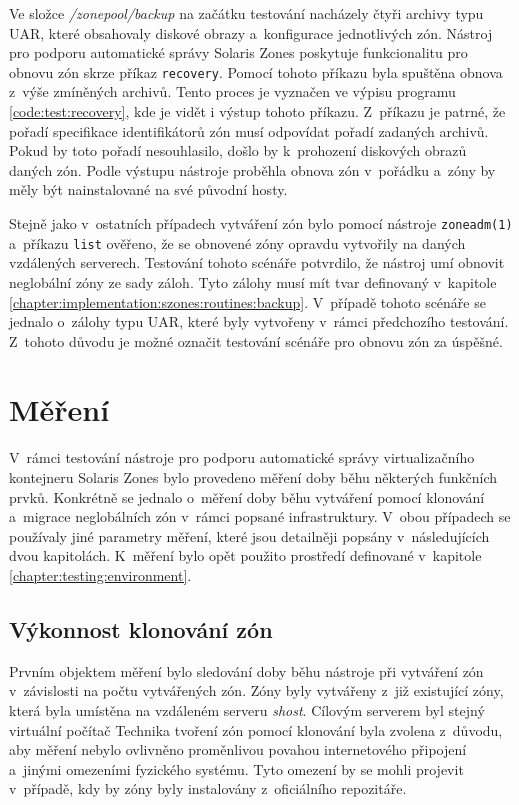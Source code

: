 Ve složce \textit{/zonepool/backup} na začátku testování nacházely čtyři archivy typu UAR, které obsahovaly diskové obrazy
a~konfigurace jednotlivých zón. Nástroj pro podporu automatické správy Solaris Zones poskytuje funkcionalitu pro obnovu zón skrze
příkaz \verb|recovery|. Pomocí tohoto příkazu byla spuštěna obnova z~výše zmíněných archivů. Tento proces je vyznačen ve výpisu
programu \ref{code:test:recovery}, kde je vidět i výstup tohoto příkazu. Z~příkazu je patrné, že pořadí specifikace identifikátorů
zón musí odpovídat pořadí zadaných archivů. Pokud by toto pořadí nesouhlasilo, došlo by k~prohození diskových obrazů daných
zón. Podle výstupu nástroje proběhla obnova zón v~pořádku a~zóny by měly být nainstalované na své původní hosty.

Stejně jako v~ostatních případech vytváření zón bylo pomocí nástroje \verb|zoneadm(1)| a~příkazu \verb|list| ověřeno, že se
obnovené zóny opravdu vytvořily na daných vzdálených serverech. Testování tohoto scénáře potvrdilo, že nástroj umí obnovit
neglobální zóny ze sady záloh. Tyto zálohy musí mít tvar definovaný v~kapitole \ref{chapter:implementation:szones:routines:backup}.
V~případě tohoto scénáře se jednalo o~zálohy typu UAR, které byly vytvořeny v~rámci předchozího testování. Z~tohoto důvodu je možné
označit testování scénáře pro obnovu zón za úspěšné.
\section{Měření}
\label{chapter:measurement}
V~rámci testování nástroje pro podporu automatické správy virtualizačního kontejneru Solaris Zones bylo provedeno měření doby
běhu některých funkčních prvků. Konkrétně se jednalo o~měření doby běhu vytváření pomocí klonování a~migrace neglobálních zón
v~rámci popsané infrastruktury. V~obou případech se používaly jiné parametry měření, které jsou detailněji popsány
v~následujících dvou kapitolách. K~měření bylo opět použito prostředí definované v~kapitole \ref{chapter:testing:environment}.
\subsection{Výkonnost klonování zón}
\label{chapter:measurement:creation}
Prvním objektem měření bylo sledování doby běhu nástroje při vytváření zón v~závislosti na počtu vytvářených zón. Zóny byly
vytvářeny z~již existující zóny, která byla umístěna na vzdáleném serveru \textit{shost}. Cílovým serverem byl stejný virtuální počítač
Technika tvoření zón pomocí klonování byla zvolena z~důvodu, aby měření nebylo ovlivněno proměnlivou povahou internetového připojení
a~jinými omezeními fyzického systému. Tyto omezení by se mohli projevit v~případě, kdy by zóny byly instalovány z~oficiálního repozitáře.

